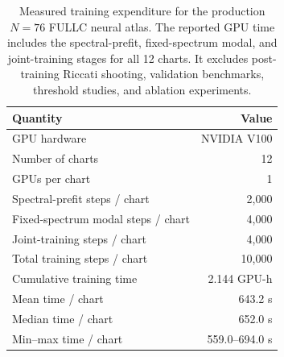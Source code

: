 \begin{table}[t]
\centering
\caption{
Measured training expenditure for the production $N=76$ FULLC neural
atlas. The reported GPU time includes the spectral-prefit,
fixed-spectrum modal, and joint-training stages for all 12
charts. It excludes post-training Riccati shooting, validation
benchmarks, threshold studies, and ablation experiments.
}
\label{tab:production_atlas_training_cost}
\small
\setlength{\tabcolsep}{7pt}
\begin{tabular}{lr}
\toprule
Quantity & Value \\
\midrule
GPU hardware
& NVIDIA V100 \\

Number of charts
& 12 \\

GPUs per chart
& 1 \\

Spectral-prefit steps / chart
& 2,000 \\

Fixed-spectrum modal steps / chart
& 4,000 \\

Joint-training steps / chart
& 4,000 \\

Total training steps / chart
& 10,000 \\

\midrule

Cumulative training time
& 2.144 GPU-h \\

Mean time / chart
& 643.2 s \\

Median time / chart
& 652.0 s \\

Min--max time / chart
& 559.0--694.0 s \\

\bottomrule
\end{tabular}
\end{table}
